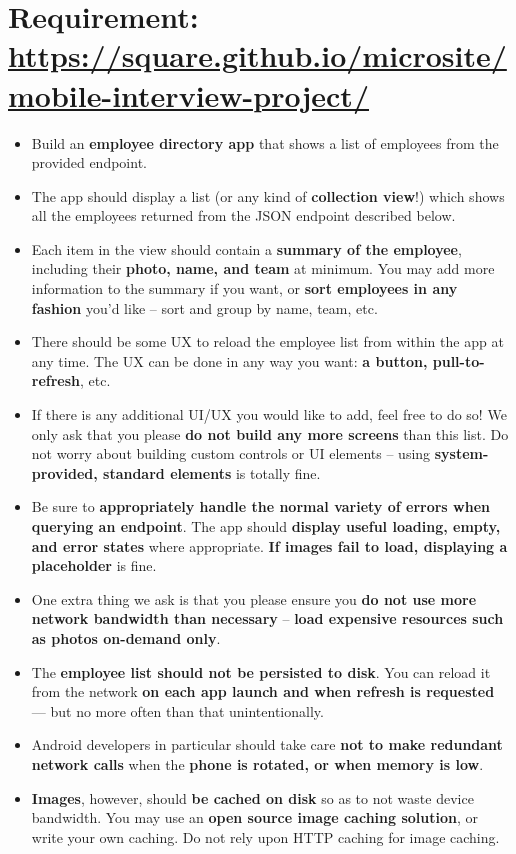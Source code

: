 \documentclass[9pt, b5paper]{article}
\begin{document}
\section{Requirement: \url{https://square.github.io/microsite/mobile-interview-project/}}
\label{sec-2}
\begin{itemize}
\item Build an \textbf{employee directory app} that shows a list of employees from the provided endpoint.
\item The app should display a list (or any kind of \textbf{collection view}!) which shows all the employees returned from the JSON endpoint described below.
\item Each item in the view should contain a \textbf{summary of the employee}, including their \textbf{photo, name, and team} at minimum. You may add more information to the summary if you want, or \textbf{sort employees in any fashion} you’d like – sort and group by name, team, etc.
\item There should be some UX to reload the employee list from within the app at any time. The UX can be done in any way you want: \textbf{a button, pull-to-refresh}, etc.
\item If there is any additional UI/UX you would like to add, feel free to do so! We only ask that you please \textbf{do not build any more screens} than this list. Do not worry about building custom controls or UI elements – using \textbf{system-provided, standard elements} is totally fine.
\item Be sure to \textbf{appropriately handle the normal variety of errors when querying an endpoint}. The app should \textbf{display useful loading, empty, and error states} where appropriate. \textbf{If images fail to load, displaying a placeholder} is fine.
\item One extra thing we ask is that you please ensure you \textbf{do not use more network bandwidth than necessary} – \textbf{load expensive resources such as photos on-demand only}.
\item The \textbf{employee list should not be persisted to disk}. You can reload it from the network \textbf{on each app launch and when refresh is requested} — but no more often than that unintentionally.
\item Android developers in particular should take care \textbf{not to make redundant network calls} when the \textbf{phone is rotated, or when memory is low}.
\item \textbf{Images}, however, should \textbf{be cached on disk} so as to not waste device bandwidth. You may use an \textbf{open source image caching solution}, or write your own caching. Do not rely upon HTTP caching for image caching.

\end{itemize}
\end{document}
